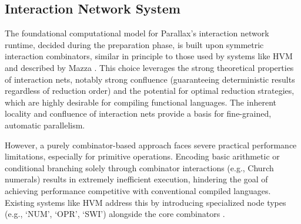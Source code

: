 



\subsection{Interaction Network System}\label{sec:prep_in_system}

The foundational computational model for Parallax's interaction network runtime, decided during the preparation phase, is built upon symmetric interaction combinators, similar in principle to those used by systems like HVM and described by Mazza \cite{mazza}. This choice leverages the strong theoretical properties of interaction nets, notably strong confluence (guaranteeing deterministic results regardless of reduction order) and the potential for optimal reduction strategies, which are highly desirable for compiling functional languages. The inherent locality and confluence of interaction nets provide a basis for fine-grained, automatic parallelism.

However, a purely combinator-based approach faces severe practical performance limitations, especially for primitive operations. Encoding basic arithmetic or conditional branching solely through combinator interactions (e.g., Church numerals) results in extremely inefficient execution, hindering the goal of achieving performance competitive with conventional compiled languages. Existing systems like HVM address this by introducing specialized node types (e.g., `NUM', `OPR', `SWI') alongside the core combinators \cite{HVMGithub}.

